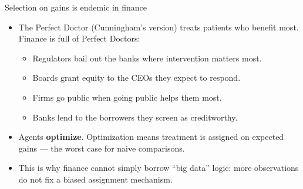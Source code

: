 \documentclass[
  11pt,
  ignorenonframetext,
  aspectratio=169,
]{beamer}
\providecommand{\tightlist}{%
  \setlength{\itemsep}{0pt}\setlength{\parskip}{0pt}}
\begin{document}
\begin{frame}{Selection on gains is endemic in finance}
\protect{}\label{selection-on-gains-is-endemic-in-finance}
\begin{itemize}
\tightlist
\item
  The Perfect Doctor (Cunningham's version) treats patients who benefit
  most. Finance is full of Perfect Doctors:

  \begin{itemize}
  \tightlist
  \item
    Regulators bail out the banks where intervention matters most.
  \item
    Boards grant equity to the CEOs they expect to respond.
  \item
    Firms go public when going public helps them most.
  \item
    Banks lend to the borrowers they screen as creditworthy.
  \end{itemize}
\item
  Agents \textbf{optimize}. Optimization means treatment is assigned on
  expected gains --- the worst case for naive comparisons.
\item
  This is why finance cannot simply borrow ``big data'' logic: more
  observations do not fix a biased assignment mechanism.
\end{itemize}
\end{frame}
\end{document}
